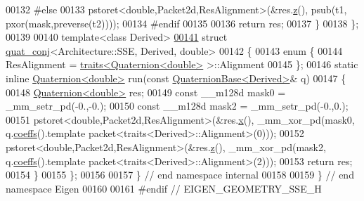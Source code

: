 \begin{DoxyCode}
00132 \textcolor{preprocessor}{#else}
00133   pstoret<double,Packet2d,ResAlignment>(&res.\hyperlink{group___geometry___module_abb82ebd1b6ac5e6c4442201ede65449b}{z}(), psub(t1, pxor(mask,preverse(t2))));
00134 \textcolor{preprocessor}{#endif}
00135 
00136   \textcolor{keywordflow}{return} res;
00137 \}
00138 \};
00139 
00140 \textcolor{keyword}{template}<\textcolor{keyword}{class} Derived>
\hyperlink{struct_eigen_1_1internal_1_1quat__conj_3_01_architecture_1_1_s_s_e_00_01_derived_00_01double_01_4}{00141} \textcolor{keyword}{struct }\hyperlink{struct_eigen_1_1internal_1_1quat__conj}{quat\_conj}<Architecture::SSE, Derived, double>
00142 \{
00143   \textcolor{keyword}{enum} \{
00144     ResAlignment = \hyperlink{struct_eigen_1_1internal_1_1traits}{traits<Quaternion<double>} >::Alignment
00145   \};
00146   \textcolor{keyword}{static} \textcolor{keyword}{inline} \hyperlink{group___geometry___module_class_eigen_1_1_quaternion}{Quaternion<double>} run(\textcolor{keyword}{const} 
      \hyperlink{group___geometry___module_class_eigen_1_1_quaternion_base}{QuaternionBase<Derived>}& q)
00147   \{
00148     \hyperlink{group___geometry___module_class_eigen_1_1_quaternion}{Quaternion<double>} res;
00149     \textcolor{keyword}{const} \_\_m128d mask0 = \_mm\_setr\_pd(-0.,-0.);
00150     \textcolor{keyword}{const} \_\_m128d mask2 = \_mm\_setr\_pd(-0.,0.);
00151     pstoret<double,Packet2d,ResAlignment>(&res.\hyperlink{group___geometry___module_a782b9d83caa9bbe84d6e0b822f2dbea9}{x}(), \_mm\_xor\_pd(mask0, q.\hyperlink{group___geometry___module_aa7bb3fc337ffa82b0ad795783eb8a2ce}{coeffs}().template 
      packet<traits<Derived>::Alignment>(0)));
00152     pstoret<double,Packet2d,ResAlignment>(&res.\hyperlink{group___geometry___module_abb82ebd1b6ac5e6c4442201ede65449b}{z}(), \_mm\_xor\_pd(mask2, q.\hyperlink{group___geometry___module_aa7bb3fc337ffa82b0ad795783eb8a2ce}{coeffs}().template 
      packet<traits<Derived>::Alignment>(2)));
00153     \textcolor{keywordflow}{return} res;
00154   \}
00155 \};
00156 
00157 \} \textcolor{comment}{// end namespace internal}
00158 
00159 \} \textcolor{comment}{// end namespace Eigen}
00160 
00161 \textcolor{preprocessor}{#endif // EIGEN\_GEOMETRY\_SSE\_H}
\end{DoxyCode}

